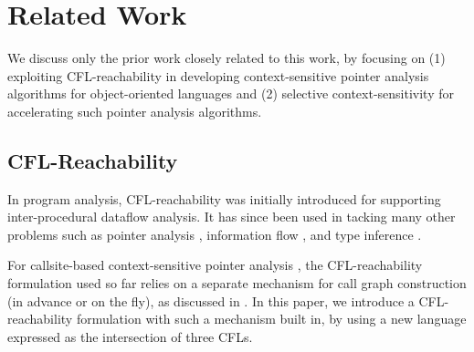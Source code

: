 \section{Related Work}
\label{sec:relatedwork}


We discuss only the prior work closely related to this work, by focusing on (1)
exploiting CFL-reachability in developing context-sensitive
pointer analysis algorithms for object-oriented languages and (2) selective
context-sensitivity for accelerating such   pointer analysis
algorithms.



\subsection{ CFL-Reachability} 
\label{sec:relatedwork:cfl}

In program analysis, CFL-reachability  \cite{reps1995precise, reps1998program} was initially introduced for supporting inter-procedural dataflow analysis. It has since been  used in tacking many other problems such as pointer analysis \cite{sridharan2005demand, sridharan2006refinement, zheng2008demand, xu2009scaling, yan2011demand, shang2012demand, zhang2013fast, lu2019precision, lu2021eagle}, information flow \cite{li2020fast, milanova2020flowcfl},
and type inference \cite{rehof2001type, pratikakis2006existential}. 

For callsite-based context-sensitive pointer analysis \cite{sridharan2006refinement, yan2011demand, shang2012demand}, 
the  CFL-reachability formulation
used so far relies
on a separate mechanism for call graph construction (in advance or on the fly),
as discussed in . 
In this paper, we introduce a CFL-reachability formulation with such a mechanism built in, by using a 
new language \LFCR
expressed as the intersection of three  CFLs. 

